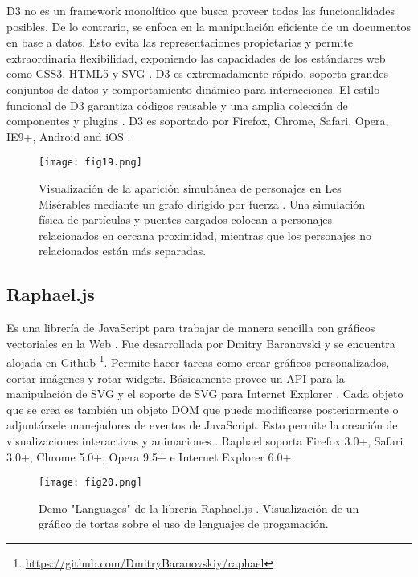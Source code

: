 D3 no es un framework monolítico que busca proveer todas las funcionalidades posibles. De lo contrario, se enfoca en la manipulación eficiente de un documentos en base a datos. Esto evita las representaciones propietarias y permite extraordinaria flexibilidad, exponiendo las capacidades de los estándares web como CSS3, HTML5 y SVG . D3 es extremadamente rápido, soporta grandes conjuntos de datos y comportamiento dinámico para interacciones. El estilo funcional de D3 garantiza códigos reusable y una amplia colección de componentes y plugins \cite{D3JS}. D3 es soportado por Firefox, Chrome, Safari, Opera, IE9+, Android and iOS \cite{GitD3}.

\begin{figure}[htp]
  \centering
  \texttt{[image: fig19.png]}
  \caption[Visualización de la aparición simultánea de personajes en Les Misérables usando D3.js]{Visualización de la aparición simultánea de personajes en Les Misérables mediante un grafo dirigido por fuerza \protect\footnotemark. Una simulación física de partículas y puentes cargados colocan a personajes relacionados en cercana proximidad, mientras que los personajes no relacionados están más separadas.}
  \label{fig:fig19}
\end{figure}


\subsection{Raphael.js}

Es una librería de JavaScript para trabajar de manera sencilla con gráficos vectoriales en la Web \cite{RaphJS}. Fue desarrollada por Dmitry Baranovski y se encuentra alojada en Github \footnote{\url{https://github.com/DmitryBaranovskiy/raphael}}. Permite hacer tareas como crear gráficos personalizados, cortar imágenes y rotar widgets. Básicamente provee un API para la manipulación de SVG y el soporte de SVG para Internet Explorer \cite{Bar09}. Cada objeto que se crea es también un objeto DOM que puede modificarse posteriormente o adjuntársele manejadores de eventos de JavaScript. Esto permite la creación de visualizaciones interactivas y animaciones . Raphael soporta Firefox 3.0+, Safari 3.0+, Chrome 5.0+, Opera 9.5+ e Internet Explorer 6.0+.

\begin{figure}[htp]
  \centering
  \texttt{[image: fig20.png]}
  \caption[Demo "Languages" de la libreria Raphael.js]{Demo "Languages" de la libreria Raphael.js \protect\footnotemark. Visualización de un gráfico de tortas sobre el uso de lenguajes de progamación.}
  \label{fig:fig20}
\end{figure}

